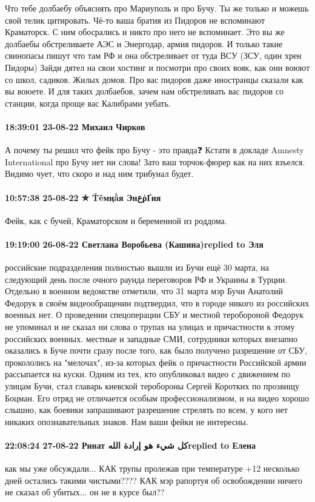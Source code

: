 Что тебе долбаебу объяснять про Мариуполь и про Бучу. Ты же только и можешь
свой телик цитировать. Чё-то ваша братия из Пидоров не вспоминают Краматорск. С
ним обосрались и никто про него не вспоминает. Это вы же долбаебы обстреливаете
АЭС и Энергодар, армия пидоров. И только такие свинопасы пишут что там РФ и она
обстреливает от туда ВСУ (ЗСУ, один хрен Пидоры) Зайди дятел на свои хостинг и
посмотри про своих вояк, как они воюют со школ, садиков. Жилых домов. Про вас
пидоров даже иностранцы сказали как вы воюете. И для таких долбаебов, зачем нам
обстреливать вас пидоров со станции, когда проще вас Калибрами уебать.

\paragraph{18:39:01 23-08-22 Михаил Чирков}

А почему ты решил что фейк про Бучу - это правда❓
Кстати в докладе Amnesty International про Бучу нет ни слова!
Зато ваш торчок-фюрер как на них взъелся. Видимо чует, что скоро и над ним трибунал будет.

\paragraph{10:57:38 25-08-22 ✮ Ťẽмңằя ЭнعῥҐия}

Фейк, как с бучей, Краматорском и беременной из роддома.


\paragraph{19:19:00 26-08-22 Светлана Воробьева (Кашина)replied to Эля}

российские подразделения полностью вышли из Бучи ещё 30 марта, на следующий
день после очного раунда переговоров РФ и Украины в Турции. Отдельно в военном
ведомстве отметили, что 31 марта мэр Бучи Анатолий Федорук в своём
видеообращении подтвердил, что в городе никого из российских военных нет. О
проведении спецоперации СБУ и местной теробороной Федорук не упоминал и не
сказал ни слова о трупах на улицах и причастности к этому российских военных.
местные и западные СМИ, сотрудники которых внезапно оказались в Буче почти
сразу после того, как было получено разрешение от СБУ, прокололись на
"мелочах", из-за которых фейк о причастности Российской армии рассыпается на
куски. Одним из тех, кто опубликовал видео с движением по улицам Бучи, стал
главарь киевской теробороны Сергей Коротких по прозвищу Боцман. Его отряд не
отличается особым профессионализмом, и на видео хорошо слышно, как боевики
запрашивают разрешение стрелять по всем, у кого нет никаких опознавательных
знаков. Нам ваши фейки не интересны.

\paragraph{22:08:24 27-08-22 Ринат كل شيء هو إرادة اللهreplied to Елена}

как мы уже обсуждали... КАК трупы пролежав при температуре +12 несколько дней
остались такими чистыми???? КАК мэр рапортуя об освобождении ничего не сказал
об убитых... он не в курсе был??



